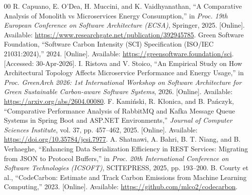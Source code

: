 \documentclass[conference]{IEEEtran}
\begin{document}
\begin{thebibliography}{00}
 R. Capuano, E. O'Dea, H. Muccini, and K. Vaidhyanathan, ``A Comparative Analysis of Monolith vs Microservices Energy Consumption,'' in \textit{Proc. 19th European Conference on Software Architecture (ECSA)}, Springer, 2025. [Online]. Available: \url{https://www.researchgate.net/publication/392945785}.
 Green Software Foundation, ``Software Carbon Intensity (SCI) Specification (ISO/IEC 21031:2024),'' 2024. [Online]. Available: \url{https://greensoftware.foundation/sci}. [Accessed: 30-Apr-2026].
 I. Ristova and V. Stoico, ``An Empirical Study on How Architectural Topology Affects Microservice Performance and Energy Usage,'' in \textit{Proc. GreenArch 2026: 1st International Workshop on Software Architecture for Green Sustainable Carbon-aware Software Systems}, 2026. [Online]. Available: \url{https://arxiv.org/abs/2604.00080}.
 F. Kamiński, R. Kłonica, and B. Pańczyk, ``Comparative Performance Analysis of RabbitMQ and Kafka Message Queue Systems in Spring Boot and ASP.NET Environments,'' \textit{Journal of Computer Sciences Institute}, vol. 37, pp. 457--462, 2025. [Online]. Available: \url{https://doi.org/10.35784/jcsi.7977}.
 A. Shatnawi, A. Bahri, B. T. Niang, and B. Verhaeghe, ``Enhancing Data Serialization Efficiency in REST Services: Migrating from JSON to Protocol Buffers,'' in \textit{Proc. 20th International Conference on Software Technologies (ICSOFT)}, SCITEPRESS, 2025, pp. 193--200.
 B. Courty et al., ``CodeCarbon: Estimate and Track Carbon Emissions from Machine Learning Computing,'' 2023. [Online]. Available: \url{https://github.com/mlco2/codecarbon}.
\end{thebibliography}
\end{document}
